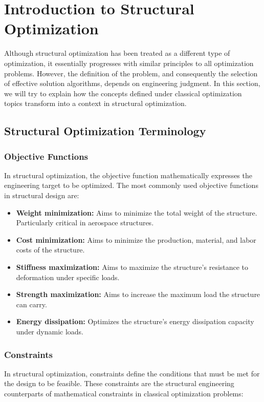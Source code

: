 \section{Introduction to Structural Optimization}
Although structural optimization has been treated as a different type of optimization, it essentially progresses with similar principles to all optimization problems. However, the definition of the problem, and consequently the selection of effective solution algorithms, depends on engineering judgment. In this section, we will try to explain how the concepts defined under classical optimization topics transform into a context in structural optimization.

\subsection{Structural Optimization Terminology}

\subsubsection{Objective Functions}
In structural optimization, the objective function mathematically expresses the engineering target to be optimized. The most commonly used objective functions in structural design are:

\begin{itemize}
    \item \textbf{Weight minimization:} Aims to minimize the total weight of the structure. Particularly critical in aerospace structures.
    \item \textbf{Cost minimization:} Aims to minimize the production, material, and labor costs of the structure.
    \item \textbf{Stiffness maximization:} Aims to maximize the structure's resistance to deformation under specific loads.
    \item \textbf{Strength maximization:} Aims to increase the maximum load the structure can carry.
    \item \textbf{Energy dissipation:} Optimizes the structure's energy dissipation capacity under dynamic loads.
\end{itemize}

\subsubsection{Constraints}
In structural optimization, constraints define the conditions that must be met for the design to be feasible. These constraints are the structural engineering counterparts of mathematical constraints in classical optimization problems:

